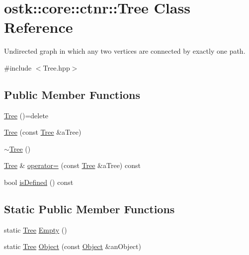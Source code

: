 \hypertarget{classostk_1_1core_1_1ctnr_1_1_tree}{}\section{ostk\+:\+:core\+:\+:ctnr\+:\+:Tree Class Reference}
\label{classostk_1_1core_1_1ctnr_1_1_tree}


Undirected graph in which any two vertices are connected by exactly one path.  




{\ttfamily \#include $<$Tree.\+hpp$>$}

\subsection*{Public Member Functions}
\begin{DoxyCompactItemize}
\item 
\hyperlink{classostk_1_1core_1_1ctnr_1_1_tree_a3960a2c77a482f88cdcdf5271b295815}{Tree} ()=delete
\item 
\hyperlink{classostk_1_1core_1_1ctnr_1_1_tree_a45d8c4d19771271433f1fcd525b9aaaf}{Tree} (const \hyperlink{classostk_1_1core_1_1ctnr_1_1_tree}{Tree} \&a\+Tree)
\item 
\hyperlink{classostk_1_1core_1_1ctnr_1_1_tree_a1fbbf116265bc413c82188dc8f406883}{$\sim$\+Tree} ()
\item 
\hyperlink{classostk_1_1core_1_1ctnr_1_1_tree}{Tree} \& \hyperlink{classostk_1_1core_1_1ctnr_1_1_tree_a9ef0c73b6fa96d246ae34b2131365fa1}{operator=} (const \hyperlink{classostk_1_1core_1_1ctnr_1_1_tree}{Tree} \&a\+Tree) const
\item 
bool \hyperlink{classostk_1_1core_1_1ctnr_1_1_tree_ac8fbfabe34924004a96cd5ad154bbfcc}{is\+Defined} () const
\end{DoxyCompactItemize}
\subsection*{Static Public Member Functions}
\begin{DoxyCompactItemize}
\item 
static \hyperlink{classostk_1_1core_1_1ctnr_1_1_tree}{Tree} \hyperlink{classostk_1_1core_1_1ctnr_1_1_tree_ace228911fa1c6f8e5a14d208ebb7717e}{Empty} ()
\item 
static \hyperlink{classostk_1_1core_1_1ctnr_1_1_tree}{Tree} \hyperlink{classostk_1_1core_1_1ctnr_1_1_tree_a958ec32a53858072b339952c7a69d8b7}{Object} (const \hyperlink{classostk_1_1core_1_1ctnr_1_1_object}{Object} \&an\+Object)
\end{DoxyCompactItemize}
